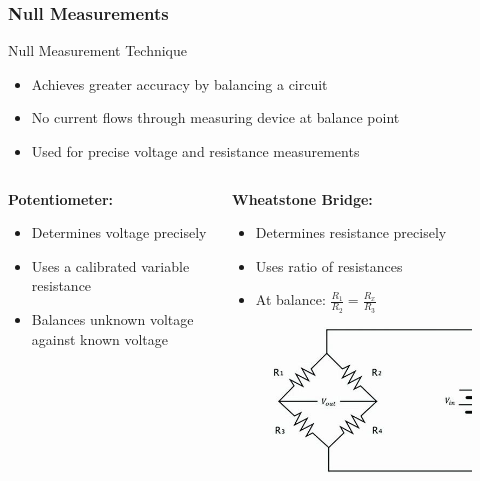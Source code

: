 \documentclass{beamer}
\begin{document}
\begin{frame}
    \frametitle{Null Measurements}
    \begin{block}{Null Measurement Technique}
        \begin{itemize}
            \item Achieves greater accuracy by balancing a circuit
            \item No current flows through measuring device at balance point
            \item Used for precise voltage and resistance measurements
        \end{itemize}
    \end{block}
    \begin{columns}
        \begin{column}{0.5\textwidth}
            \textbf{Potentiometer:}
            \begin{itemize}
                \item Determines voltage precisely
                \item Uses a calibrated variable resistance
                \item Balances unknown voltage against known voltage
            \end{itemize}
        \end{column}
        \begin{column}{0.5\textwidth}
            \textbf{Wheatstone Bridge:}
            \begin{itemize}
                \item Determines resistance precisely
                \item Uses ratio of resistances
                \item At balance: $\frac{R_1}{R_2} = \frac{R_x}{R_3}$
            \end{itemize}
   
    \begin{figure}
        \centering
        \includegraphics[width=0.5\linewidth]{phys12-circuits-wheatstone-bridge.jpg}
    \end{figure}
         \end{column}
    \end{columns}
\end{frame}
\end{document}
